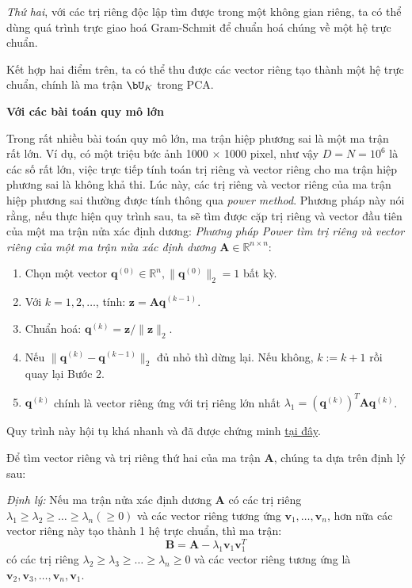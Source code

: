 	 \textit{Thứ hai}, với các trị riêng độc lập tìm được trong một không gian riêng, ta có thể dùng quá trình trực giao hoá Gram-Schmit để chuẩn hoá chúng về một hệ trực chuẩn.
	 
Kết hợp hai điểm trên, ta có thể thu được các vector riêng tạo thành một hệ trực chuẩn, chính là ma trận $\bU_K$ trong PCA.
	 
	 
	 \textbf{Với các bài toán quy mô lớn}
	 
	 Trong rất nhiều bài toán quy mô lớn, ma trận hiệp phương sai là một ma trận rất lớn. Ví dụ, có một triệu bức ảnh
	 1000 $\times$ 1000 pixel, như vậy $D = N = 10^6$ là các số rất lớn, việc trực 	 tiếp tính toán trị riêng và vector riêng cho ma trận hiệp phương sai là không 	 khả thi. Lúc này, các trị riêng và vector riêng của ma trận hiệp phương sai thường được tính thông qua \textit{power method}. Phương pháp này nói rằng, nếu thực hiện quy trình sau, ta sẽ tìm được cặp trị riêng và vector đầu tiên của một ma trận nửa xác định dương:
	 \textit{Phương pháp Power tìm trị riêng và vector riêng của một ma trận nửa xác định dương $\mathbf{A} \in \mathbb{R}^{n \times n}$}:
	  \begin{enumerate}
	   \item Chọn một vector $\mathbf{q}^{(0)} \in \mathbb{R}^n, \|\mathbf{q}^{(0)}\|_2 = 1$ bất kỳ.
	    \item Với $k = 1, 2, \dots$, tính: $\mathbf{z} = \mathbf{Aq}^{(k-1)}$.
	    \item Chuẩn hoá: $\mathbf{q}^{(k)} = \mathbf{z} / \|\mathbf{z}\|_2$.
	    \item Nếu $\|\mathbf{q}^{(k)} - \mathbf{q}^{(k-1)}\|_2$ đủ nhỏ thì dừng lại. Nếu không, $k := k + 1$ rồi quay lại Bước 2.
	   \item $\mathbf{q}^{(k)}$ chính là vector riêng ứng với trị riêng lớn nhất $\lambda_1 = (\mathbf{q}^{(k)})^T\mathbf{A}\mathbf{q}^{(k)}$.
	  \end{enumerate}
	 
	  Quy trình này hội tụ khá nhanh và đã được chứng minh \cite{} \href{http://www.cs.huji.ac.il/~csip/tirgul2.pdf}{tại đây}.
	 
	 Để tìm vector riêng và trị riêng thứ hai của ma trận $\mathbf{A}$, chúng ta dựa trên định lý sau:
	 
	  \textit{Định lý:} Nếu ma trận nửa xác định dương $\mathbf{A}$ có các trị riêng $\lambda_1 \geq \lambda_2 \geq \dots \geq \lambda_n ( \geq 0)$ và các vector riêng tương ứng $\mathbf{v}_1, \dots, \mathbf{v}_n$, hơn nữa các vector riêng này tạo thành 1 hệ trực chuẩn, thì ma trận:
	  \begin{equation}
	    \mathbf{B} = \mathbf{A} - \lambda_1 \mathbf{v}_1 \mathbf{v}_1^T
	  \end{equation}
	  có các trị riêng $\lambda_2 \geq \lambda_3 \geq \dots \geq \lambda_n \geq 0$ và các vector riêng tương ứng là $\mathbf{v}_2, \mathbf{v}_3, \dots, \mathbf{v}_n, \mathbf{v}_1$.
	 

